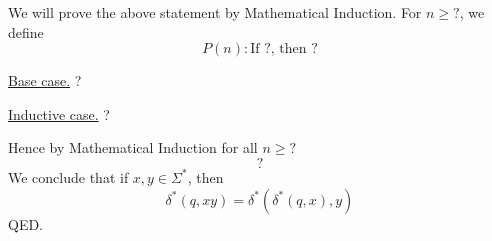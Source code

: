 We will prove the above statement by Mathematical Induction.
For $n \geq ?$, we define
\[
P(n):
\text{
If ?, then ?
}
\]

\underline{Base case.} ?


\underline{Inductive case.} ?

Hence by Mathematical Induction for all $n \geq ?$
\[
?
\]
We conclude that if $x,y \in \Sigma^*$, then
\[
\delta^*(q, xy) = \delta^*(\delta^*(q, x), y)
\]
QED.
